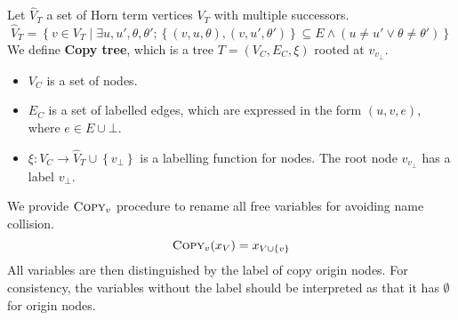 \documentclass[a4paper,12pt]{article}
\begin{document}
Let $\hat V_T$ a set of Horn term vertices $V_T$ with multiple
successors.
\[ \hat V_T = \left\lbrace v \in V_T \middle|
\exists u, u', \theta, \theta';
\left\lbrace (v,u,\theta), (v,u',\theta') \right\rbrace \subseteq E \wedge
(u \ne u' \vee \theta \ne \theta') \right\rbrace \]
We define \textbf{Copy tree}, which is a tree $T=(V_C,E_C,\xi)$
rooted at $v_{v_\bot}$.
\begin{itemize}
\item $V_C$ is a set of nodes.
\item $E_C$ is a set of labelled edges, which are expressed in the
  form $(u,v,e)$, where $e \in E \cup {\bot}$.
\item $\xi: V_C \rightarrow \hat V_T \cup \left\lbrace v_\bot
  \right\rbrace$ is a labelling function for nodes. The root node
  $v_{v_\bot}$ has a label $v_\bot$.
\end{itemize}

We provide $\textsc{Copy}_v$ procedure to rename all free variables
for avoiding name collision.
\[ \textsc{Copy}_v (x_V) = x_{V \cup \left\lbrace v \right\rbrace} \]
All variables are then distinguished by the label of copy origin
nodes. For consistency, the variables without the label should be
interpreted as that it has $\emptyset$ for origin nodes.
\end{document}
